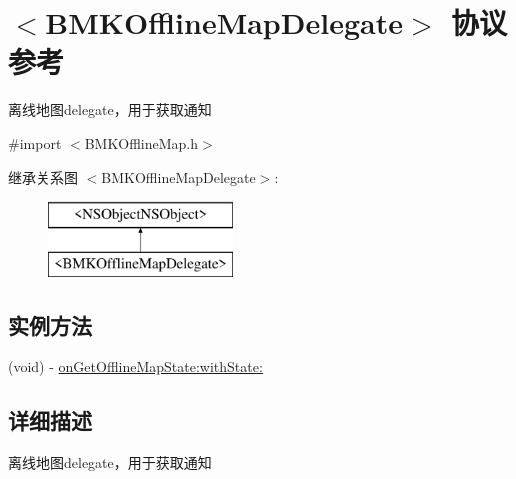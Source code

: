 \hypertarget{protocol_b_m_k_offline_map_delegate-p}{\section{$<$B\-M\-K\-Offline\-Map\-Delegate$>$ 协议参考}
\label{protocol_b_m_k_offline_map_delegate-p}
}


离线地图delegate，用于获取通知  




{\ttfamily \#import $<$B\-M\-K\-Offline\-Map.\-h$>$}

继承关系图 $<$B\-M\-K\-Offline\-Map\-Delegate$>$\-:\begin{figure}[H]
\begin{center}
\leavevmode
\includegraphics[height=2.000000cm]{protocol_b_m_k_offline_map_delegate-p}
\end{center}
\end{figure}
\subsection*{实例方法}
\begin{DoxyCompactItemize}
\item 
(void) -\/ \hyperlink{protocol_b_m_k_offline_map_delegate-p_abe1dd90ae5ffd9612423c547ab9b1970}{on\-Get\-Offline\-Map\-State\-:with\-State\-:}
\end{DoxyCompactItemize}


\subsection{详细描述}
离线地图delegate，用于获取通知 

